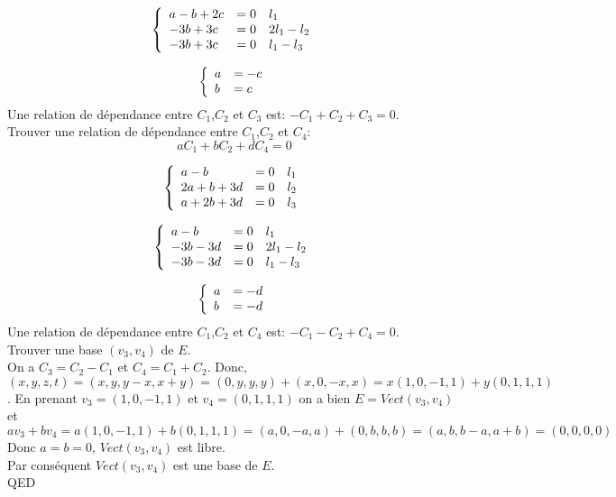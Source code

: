 \documentclass[]{book}
\theoremstyle{definition}
\begin{document}
$$
\left\{ 
\begin{array}{l l l}
a - b + 2c & = 0 & l_1 \\
    -3b + 3c & = 0 & 2l_1-l_2 \\
    -3b + 3c & = 0 & l_1 - l_3 \\
\end{array}
\right. 
$$

$$
\left\{ 
\begin{array}{l l}
a & = -c \\
b & = c \\
\end{array}
\right. 
$$
Une relation de d\'ependance entre $C_1$,$C_2$ et $C_3$ est: $-C_1 + C_2 + C_3 = 0$.\\


Trouver une relation de d\'ependance entre $C_1$,$C_2$ et $C_4$:\\
$$aC_1+bC_2+dC_4 = 0$$

$$
\left\{ 
\begin{array}{l l l}
a - b  & = 0 & l_1\\
2a + b + 3d & = 0 & l_2 \\
a +   2b + 3d & = 0 & l_3 \\
\end{array}
\right. 
$$

$$
\left\{ 
\begin{array}{l l l}
a - b  & = 0 & l_1\\
    -3b - 3d & = 0 & 2l_1 - l_2\\
    -3b - 3d & = 0 & l_1 - l_3\\
\end{array}
\right. 
$$

$$
\left\{ 
\begin{array}{l l}
a & = -d \\
b & = -d \\
\end{array}
\right. 
$$
Une relation de d\'ependance entre $C_1$,$C_2$ et $C_4$ est: $-C_1 - C_2 + C_4 = 0$.\\


Trouver une base $(v_3, v_4)$ de $E$.\\
On a $C_3=C_2-C_1$ et $C_4=C_1+C_2$. Donc, $(x,y,z,t) = (x,y,y-x,x+y) = (0,y,y,y) + (x,0,-x,x) = x(1,0,-1,1) + y(0,1,1,1)$. En prenant $v_3 = (1,0,-1,1)$ et $v_4 = (0,1,1,1)$ on a bien $E = Vect(v_3,v_4)$ et 
$$av_3 + bv_4 = a(1,0,-1,1) + b(0,1,1,1) = (a,0,-a,a)+(0,b,b,b) = (a,b,b-a,a+b) = (0,0,0,0)$$
Donc $a=b=0$, $Vect(v_3,v_4)$ est libre.\\
Par cons\'equent $Vect(v_3,v_4)$ est une base de $E$.\\


QED
\end{document}
